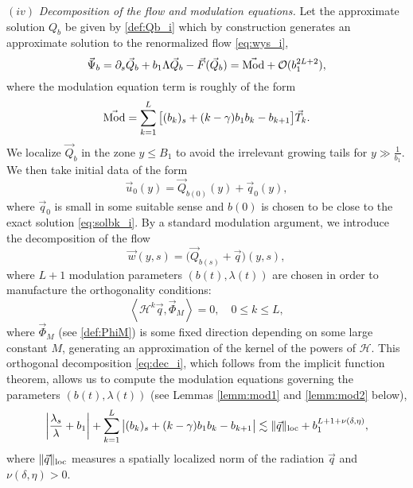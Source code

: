 \documentclass[11pt]{aims}
\theoremstyle{definition}
\numberwithin{equation}{section}
\begin{document}
\noindent $(iv)$ \textit{Decomposition of the flow and modulation equations.} Let the approximate solution $Q_b$ be given by \eqref{def:Qb_i} which by construction generates an approximate solution to the renormalized flow \eqref{eq:wys_i},
$$\vec \Psi_b = {\partial_s} \vec Q_b  + b_1 \Lambda \vec Q_b - \vec F(\vec Q_b) = \vec{\textup{Mod}} + {\mathcal{O}}(b_1^{2L + 2}),$$
where the modulation equation term is roughly of the form
$$\vec{\textup{Mod}} = \sum_{k = 1}^L \big[(b_k)_s + (k - \gamma)b_1b_k - b_{k+1}\big]\vec T_k.$$
We localize $\vec Q_b$ in the zone $y \leq B_1$ to avoid the irrelevant growing tails for $y \gg \frac{1}{b_1}$. We then take initial data of the form
$$\vec u_0(y) = \vec Q_{b(0)}(y) + \vec q_0(y),$$
where $\vec q_0$ is small in some suitable sense and $b(0)$  is chosen to be close to the exact solution \eqref{eq:solbk_i}. By a standard modulation argument, we introduce the decomposition of the flow
\begin{equation}\label{eq:dec_i}
\vec w(y,s) = \big(\vec Q_{b(s)} + \vec q\big)(y,s),
\end{equation}
where $L+1$ modulation parameters $(b(t), \lambda(t))$ are chosen in order to manufacture the orthogonality conditions:
\begin{equation}\label{eq:orh_i}
\left<{\mathscr{H}}^k \vec q, \vec \Phi_M \right> = 0, \quad 0 \leq k \leq L,
\end{equation}
where $\vec \Phi_M$ (see \eqref{def:PhiM}) is some fixed direction depending on some large constant $M$, generating an approximation of the kernel of the powers of ${\mathscr{H}}$. This orthogonal decomposition \eqref{eq:dec_i}, which follows from the implicit function theorem, allows us to compute the modulation equations governing the parameters $(b(t), \lambda(t))$ (see Lemmas \ref{lemm:mod1} and \ref{lemm:mod2} below),
\begin{equation}\label{eq:mod_i}
\left|\frac{\lambda_s}{\lambda} + b_1\right| +  \sum_{k = 1}^L \big|(b_k)_s + (k - \gamma)b_1b_k - b_{k+1}\big| \lesssim \|\vec q\|_{\textup{loc}} + b_1^{L + 1 + \nu(\delta, \eta)},
\end{equation}
where $\|\vec q\|_{\textup{loc}}$ measures a spatially localized norm of the radiation $\vec q$ and $\nu(\delta, \eta) > 0$.\\
\end{document}
